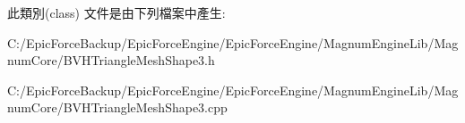 此類別(class) 文件是由下列檔案中產生\+:\begin{DoxyCompactItemize}
\item 
C\+:/\+Epic\+Force\+Backup/\+Epic\+Force\+Engine/\+Epic\+Force\+Engine/\+Magnum\+Engine\+Lib/\+Magnum\+Core/B\+V\+H\+Triangle\+Mesh\+Shape3.\+h\item 
C\+:/\+Epic\+Force\+Backup/\+Epic\+Force\+Engine/\+Epic\+Force\+Engine/\+Magnum\+Engine\+Lib/\+Magnum\+Core/B\+V\+H\+Triangle\+Mesh\+Shape3.\+cpp\end{DoxyCompactItemize}
